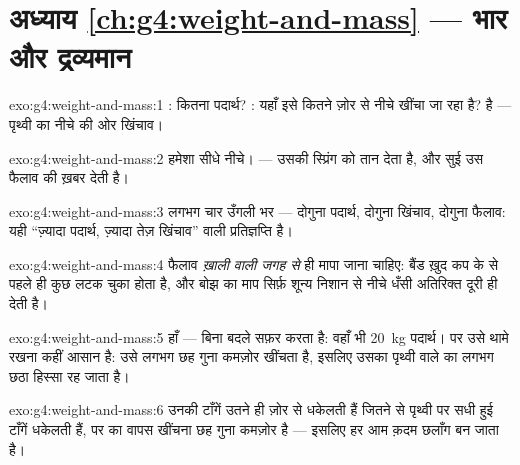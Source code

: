 \section*{अध्याय \ref{ch:g4:weight-and-mass} --- भार और द्रव्यमान}

\begin{solution}{exo:g4:weight-and-mass:1}
: कितना पदार्थ? : यहाँ इसे कितने ज़ोर से नीचे खींचा जा
रहा है?   है --- पृथ्वी का नीचे की ओर खिंचाव।
\end{solution}

\begin{solution}{exo:g4:weight-and-mass:2}
हमेशा सीधे नीचे।  ---  उसकी स्प्रिंग को तान देता है,
और सुई उस फैलाव की ख़बर देती है।
\end{solution}

\begin{solution}{exo:g4:weight-and-mass:3}
लगभग चार उँगली भर --- दोगुना पदार्थ, दोगुना खिंचाव, दोगुना फैलाव:
यही ``ज़्यादा पदार्थ, ज़्यादा तेज़ खिंचाव'' वाली प्रतिज्ञप्ति है।
\end{solution}

\begin{solution}{exo:g4:weight-and-mass:4}
फैलाव \emph{ख़ाली वाली जगह से} ही मापा जाना चाहिए: बैंड ख़ुद कप के
 से पहले ही कुछ लटक चुका होता है, और बोझ का माप सिर्फ़ शून्य निशान
से नीचे धँसी अतिरिक्त दूरी ही देती है।
\end{solution}

\begin{solution}{exo:g4:weight-and-mass:5}
हाँ ---  बिना बदले सफ़र करता है: वहाँ भी \qty{20}{kg}
पदार्थ। पर उसे थामे रखना कहीं आसान है:  उसे लगभग छह गुना
कमज़ोर खींचता है, इसलिए उसका  पृथ्वी वाले  का लगभग छठा हिस्सा
रह जाता है।
\end{solution}

\begin{solution}{exo:g4:weight-and-mass:6}
उनकी टाँगें उतने ही ज़ोर से धकेलती हैं जितने से पृथ्वी पर सधी हुई
टाँगें धकेलती हैं, पर  का वापस खींचना छह गुना कमज़ोर है ---
इसलिए हर आम क़दम छलाँग बन जाता है।
\end{solution}

